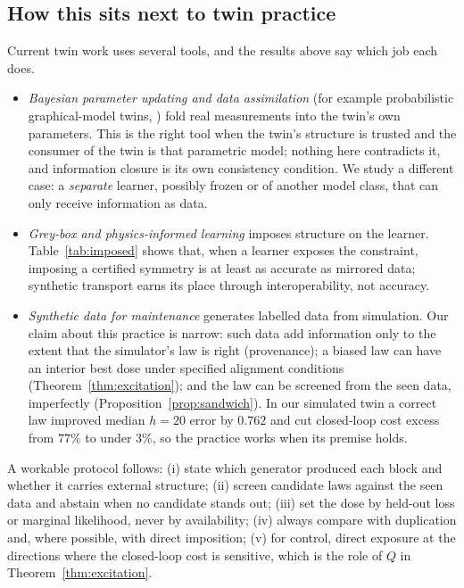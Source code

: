 \subsection{How this sits next to twin practice}
Current twin work uses several tools, and the results above say which job each does.
\begin{itemize}[leftmargin=1.2em,itemsep=1pt,topsep=2pt]
\item \emph{Bayesian parameter updating and data assimilation} (for example probabilistic graphical-model twins, \citealp{kapteyn2021probabilistic}) fold real measurements into the twin's own parameters. This is the right tool when the twin's structure is trusted and the consumer of the twin is that parametric model; nothing here contradicts it, and information closure is its own consistency condition. We study a different case: a \emph{separate} learner, possibly frozen or of another model class, that can only receive information as data.
\item \emph{Grey-box and physics-informed learning} \citep{raissi2019pinn} imposes structure on the learner. Table~\ref{tab:imposed} shows that, when a learner exposes the constraint, imposing a certified symmetry is at least as accurate as mirrored data; synthetic transport earns its place through interoperability, not accuracy.
\item \emph{Synthetic data for maintenance} \citep{nieminen2026synthetic,wuttke2026digital} generates labelled data from simulation. Our claim about this practice is narrow: such data add information only to the extent that the simulator's law is right (provenance); a biased law can have an interior best dose under specified alignment conditions (Theorem~\ref{thm:excitation}); and the law can be screened from the seen data, imperfectly (Proposition~\ref{prop:sandwich}). In our simulated twin a correct law improved median $h=20$ error by $0.762$ and cut closed-loop cost excess from $77\%$ to under $3\%$, so the practice works when its premise holds.
\end{itemize}
A workable protocol follows: (i) state which generator produced each block and whether it carries external structure; (ii) screen candidate laws against the seen data and abstain when no candidate stands out; (iii) set the dose by held-out loss or marginal likelihood, never by availability; (iv) always compare with duplication and, where possible, with direct imposition; (v) for control, direct exposure at the directions where the closed-loop cost is sensitive, which is the role of $Q$ in Theorem~\ref{thm:excitation}.


